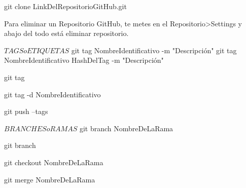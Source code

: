 	git clone LinkDelRepositorioGitHub.git		%

	Para eliminar un Repositorio GitHub, te metes en el Repositorio>Settings y abajo del todo está eliminar repositorio.



$ TAGS o ETIQUETAS $
	git tag NombreIdentificativo -m "Descripción"				%
	git tag NombreIdentificativo HashDelTag -m "Descripción"	%

	git tag		%

	git tag -d NombreIdentificativo		%

	git push --tags		%


$ BRANCHES o RAMAS $
	git branch NombreDeLaRama	%
	
	git branch					%

	git checkout NombreDeLaRama	%

	git merge NombreDeLaRama	%




